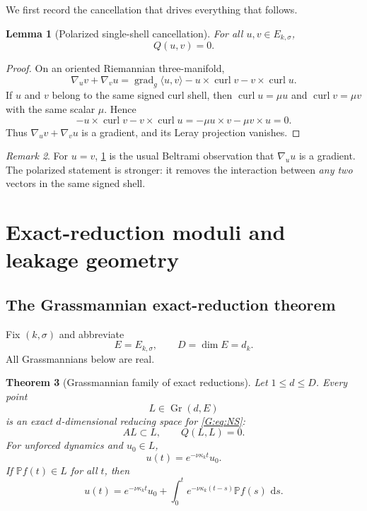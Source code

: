 \documentclass[
 aps,
 prd,
 reprint,
 amsmath,
 amssymb,
 nofootinbib,
 superscriptaddress
]{revtex4-2}
\newtheorem{theorem}{Theorem}[section]
\newtheorem{lemma}[theorem]{Lemma}
\theoremstyle{definition}
\theoremstyle{remark}
\newtheorem{remark}[theorem]{Remark}
\newcommand{\PP}{\mathbb P}
\newcommand{\curl}{\operatorname{curl}}
\newcommand{\gradg}{\operatorname{grad}_g}
\newcommand{\Gr}{\operatorname{Gr}}
\newcommand{\dd}{\,\mathrm d}
\begin{document}
We first record the cancellation that drives everything that follows.

\begin{lemma}[Polarized single-shell cancellation]
\label{G:lem:shellcancel}
For all $u,v\in E_{k,\sigma}$,
\begin{equation}
          Q(u,v)=0.
          \label{G:eq:shellcancel}
\end{equation}
\end{lemma}

\begin{proof}
On an oriented Riemannian three-manifold,
\[
 \nabla_uv+\nabla_vu
 =
 \gradg\langle u,v\rangle
 -u\times\curl v-v\times\curl u.
\]
If $u$ and $v$ belong to the same signed curl shell, then
$\curl u=\mu u$ and $\curl v=\mu v$ with the same scalar $\mu$.  Hence
\[
 -u\times\curl v-v\times\curl u
 =
 -\mu u\times v-\mu v\times u=0.
\]
Thus $\nabla_uv+\nabla_vu$ is a gradient, and its Leray projection vanishes.
\end{proof}

\begin{remark}
For $u=v$, \cref{G:lem:shellcancel} is the usual Beltrami observation that
$\nabla_u u$ is a gradient.  The polarized statement is stronger: it removes
the interaction between \emph{any two} vectors in the same signed shell.
\end{remark}


\section{Exact-reduction moduli and leakage geometry}

\subsection{The Grassmannian exact-reduction theorem}

Fix $(k,\sigma)$ and abbreviate
\[
          E=E_{k,\sigma},
          \qquad
          D=\dim E=d_k.
\]
All Grassmannians below are real.

\begin{theorem}[Grassmannian family of exact reductions]
\label{G:thm:grassmann}
Let $1\le d\le D$.  Every point
\[
          L\in\Gr(d,E)
\]
is an exact $d$-dimensional reducing space for \eqref{G:eq:NS}:
\begin{equation}
          AL\subset L,
          \qquad
          Q(L,L)=0.
          \label{G:eq:exactL}
\end{equation}
For unforced dynamics and $u_0\in L$,
\begin{equation}
          u(t)=e^{-\nu\kappa_k t}u_0.
          \label{G:eq:fiberflow}
\end{equation}
If $\PP f(t)\in L$ for all $t$, then
\begin{equation}
 u(t)
 =
 e^{-\nu\kappa_k t}u_0
 +
 \int_0^t
 e^{-\nu\kappa_k(t-s)}\PP f(s)\,\dd s.
 \label{G:eq:forcedfiber}
\end{equation}
\end{theorem}
\end{document}
